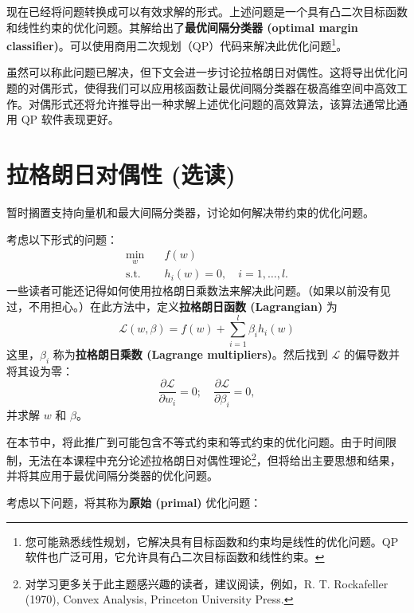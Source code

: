 现在已经将问题转换成可以有效求解的形式。上述问题是一个具有凸二次目标函数和线性约束的优化问题。其解给出了\textbf{最优间隔分类器 (optimal margin classifier)}。可以使用商用二次规划（QP）代码来解决此优化问题\footnote{您可能熟悉线性规划，它解决具有目标函数和约束均是线性的优化问题。QP 软件也广泛可用，它允许具有凸二次目标函数和线性约束。}。

虽然可以称此问题已解决，但下文会进一步讨论拉格朗日对偶性。这将导出优化问题的对偶形式，使得我们可以应用核函数让最优间隔分类器在极高维空间中高效工作。对偶形式还将允许推导出一种求解上述优化问题的高效算法，该算法通常比通用 QP 软件表现更好。

\section{拉格朗日对偶性 (选读)}

暂时搁置支持向量机和最大间隔分类器，讨论如何解决带约束的优化问题。

考虑以下形式的问题：
\begin{align*}
    \min_w \quad &f(w)\\
    \text{s.t.} \quad &h_i(w)=0,\quad i=1,\dots,l.
\end{align*}
一些读者可能还记得如何使用拉格朗日乘数法来解决此问题。（如果以前没有见过，不用担心。）在此方法中，定义\textbf{拉格朗日函数 (Lagrangian)} 为
\[
    \mathcal{L}(w, \beta) = f(w) + \sum_{i=1}^l \beta_i h_i(w)
\]
这里，$\beta_i$ 称为\textbf{拉格朗日乘数 (Lagrange multipliers)}。然后找到 $\mathcal{L}$ 的偏导数并将其设为零：
\[
    \frac{\partial \mathcal{L}}{\partial w_i} = 0; \quad \frac{\partial \mathcal{L}}{\partial \beta_i} = 0,
\]
并求解 $w$ 和 $\beta$。

在本节中，将此推广到可能包含不等式约束和等式约束的优化问题。由于时间限制，无法在本课程中充分论述拉格朗日对偶性理论\footnote{对学习更多关于此主题感兴趣的读者，建议阅读，例如，R. T. Rockafeller (1970), Convex Analysis, Princeton University Press.}，但将给出主要思想和结果，并将其应用于最优间隔分类器的优化问题。

考虑以下问题，将其称为\textbf{原始 (primal)} 优化问题：


